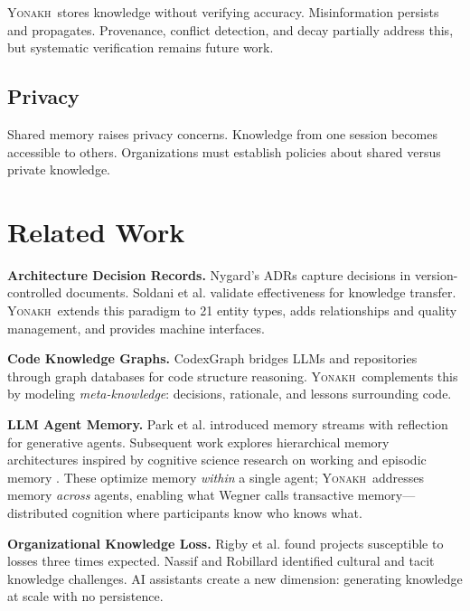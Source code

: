 \documentclass[10pt,journal,compsoc]{IEEEtran}
\newcommand{\yonakh}{\textsc{Yonakh}}
\begin{document}
\yonakh\ stores knowledge without verifying accuracy. Misinformation persists and propagates. Provenance, conflict detection, and decay partially address this, but systematic verification remains future work.

\subsection{Privacy}

Shared memory raises privacy concerns. Knowledge from one session becomes accessible to others. Organizations must establish policies about shared versus private knowledge.

\section{Related Work}

\textbf{Architecture Decision Records.} Nygard's ADRs \cite{nygard2011adr} capture decisions in version-controlled documents. Soldani et al. \cite{soldani2024adr} validate effectiveness for knowledge transfer. \yonakh\ extends this paradigm to 21 entity types, adds relationships and quality management, and provides machine interfaces.

\textbf{Code Knowledge Graphs.} CodexGraph \cite{liu2024codexgraph} bridges LLMs and repositories through graph databases for code structure reasoning. \yonakh\ complements this by modeling \emph{meta-knowledge}: decisions, rationale, and lessons surrounding code.

\textbf{LLM Agent Memory.} Park et al. \cite{park2023generative} introduced memory streams with reflection for generative agents. Subsequent work explores hierarchical memory architectures inspired by cognitive science research on working and episodic memory \cite{baddeley2012working,tulving1985memory}. These optimize memory \emph{within} a single agent; \yonakh\ addresses memory \emph{across} agents, enabling what Wegner \cite{wegner1987transactive} calls transactive memory---distributed cognition where participants know who knows what.

\textbf{Organizational Knowledge Loss.} Rigby et al. \cite{rigby2016quantifying} found projects susceptible to losses three times expected. Nassif and Robillard \cite{nassif2021turnover} identified cultural and tacit knowledge challenges. AI assistants create a new dimension: generating knowledge at scale with no persistence.
\end{document}
